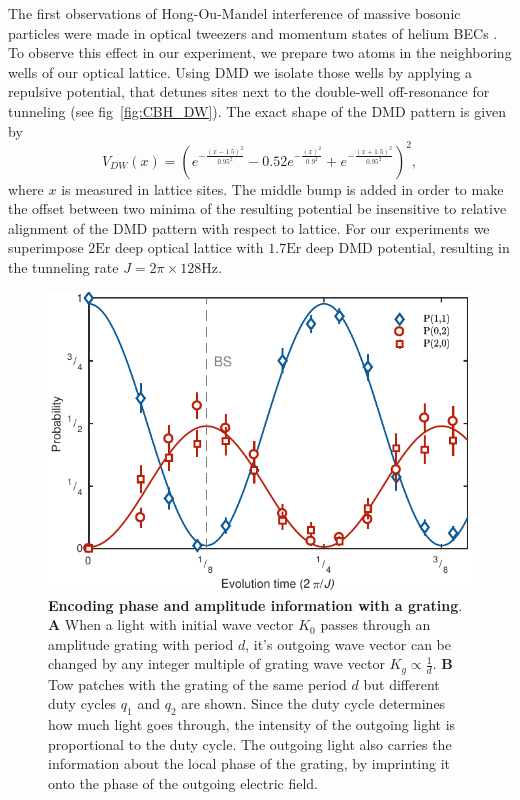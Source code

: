 The first observations of Hong-Ou-Mandel interference of massive bosonic particles were made in optical tweezers \cite{Kaufman2014} and momentum states of helium BECs \cite{Lopes2015}. To observe this effect in our experiment, we prepare two atoms in the neighboring wells of our optical lattice. Using DMD we isolate those wells by applying a repulsive potential, that detunes sites next to the double-well off-resonance for tunneling (see fig~\ref{fig:CBH_DW}). The exact shape of the DMD pattern is given by
\begin{equation}
V_{DW}(x) = (e^{-\frac{(x-1.5)^2}{0.95^2}} - 0.52e^{-\frac{(x)^2}{0.9^2}} + e^{-\frac{(x+1.5)^2}{0.95^2}})^2,
\end{equation}
where $x$ is measured in lattice sites. The middle bump is added in order to make the offset between two minima of the resulting potential be insensitive to relative alignment of the DMD pattern with respect to lattice. For our experiments we superimpose $2\textrm{Er}$ deep optical lattice with $1.7\textrm{Er}$ deep DMD potential, resulting in the tunneling rate $J = 2 \pi \times 128 \textrm{Hz}$.

\begin{figure}[t]
	\centering
	\includegraphics[scale=1]{figures/CBH_HOM.pdf}
	\caption{{\bf Encoding phase and amplitude information with a grating}. {\bf A} When a light with initial wave vector $K_0$ passes through an amplitude grating with period $d$, it's outgoing wave vector can be changed by any integer multiple of grating wave vector $K_g\propto \frac{1}{d}$. {\bf B} Tow patches with the grating of the same period $d$ but different duty cycles $q_1$ and $q_2$ are shown. Since the duty cycle determines how much light goes through, the intensity of the outgoing light is proportional to the duty cycle. The outgoing light also carries the information about the local phase of the grating, by imprinting it onto the phase of the outgoing electric field.}
	\label{fig:CBH_HOM}
\end{figure}

